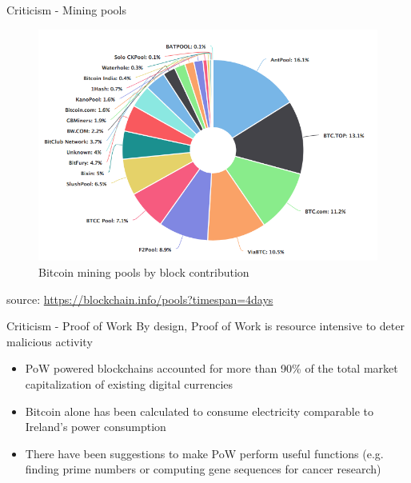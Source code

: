 \documentclass[11pt]{beamer}
\begin{document}
\begin{frame}{Criticism - Mining pools}
	\begin{figure}[]
		\centering
		\includegraphics  [scale=0.35]{Images/pool}
		\caption{Bitcoin mining pools by block contribution}
	\end{figure}
	\begin{scriptsize}
		source: \href{https://blockchain.info/pools?timespan=4days}{https://blockchain.info/pools?timespan=4days}
	\end{scriptsize}
\end{frame}


\begin{frame}{Criticism - Proof of Work}
	By design, Proof of Work is resource intensive to deter malicious activity
	\begin{itemize}
		\item PoW powered blockchains accounted for more than 90\% of the total market capitalization of existing digital currencies
		\item Bitcoin alone has been calculated to consume electricity comparable to Ireland's power consumption
		\item There have been suggestions to make PoW perform useful functions (e.g. finding prime numbers or computing gene sequences for cancer research)
	\end{itemize}
\end{frame}

\end{document}
